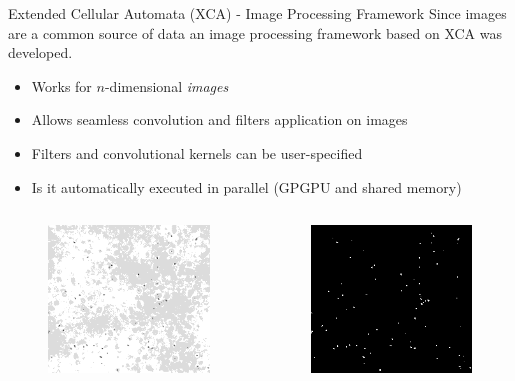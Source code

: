 \documentclass{beamer}
\begin{document}
  \begin{frame}{ Extended Cellular Automata (XCA) - Image Processing Framework}
		Since images are a common source of data an image processing framework based on XCA was developed.
		\begin{itemize}
			\item Works for $n$-dimensional \textit{images}
			\item Allows seamless convolution and filters application on images 
			\item Filters and convolutional kernels can be user-specified
			\item Is it automatically executed in parallel (GPGPU and shared memory)
		\end{itemize}
\begin{columns}[T] %
\begin{column}{.48\textwidth}

\begin{figure}
			 \centering
			   \includegraphics[scale=0.45]{bacteriasmall}
		 \end{figure}
\end{column}%
\hfill%
\begin{column}{.58\textwidth}

\begin{figure}
			 \centering
			   \includegraphics[scale=0.45]{bacteriasmall_threshold}
		 \end{figure}

\end{column}%
\end{columns}	

		
\end{frame} %
\end{document}
